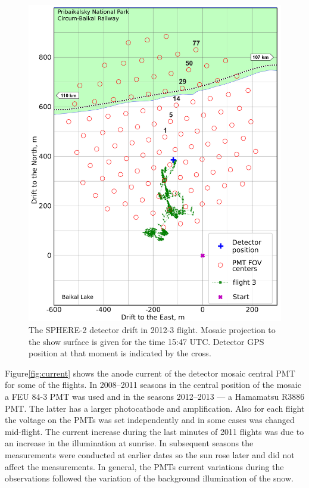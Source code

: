 \documentclass[universe,article,submit,moreauthors,pdftex]{Definitions/mdpi}
\begin{document}
\begin{paracol}{2}
\begin{figure}[tb]
\begin{minipage}[t]{0.48\textwidth}
        \includegraphics[width=\textwidth]{2012_drift-mod.pdf}
        \caption{The SPHERE-2 detector drift in 2012-3 flight. Mosaic projection to the show surface is given for the time 15:47 UTC. Detector GPS position at that moment is indicated by the cross.}
        \label{fig:2012-drift}
    \end{minipage}
\end{figure}

 Figure\ref{fig:current} shows the anode current of the detector mosaic central PMT for some of the flights. In 2008--2011 seasons in the central position of the mosaic a FEU 84-3 PMT was used and in the seasons 2012--2013 --- a Hamamatsu R3886 PMT. The latter has a larger photocathode and amplification. Also for each flight the voltage on the PMTs was set independently and in some cases was changed mid-flight. The current increase during the last minutes of 2011 flights was due to an increase in the illumination at sunrise. In subsequent seasons the measurements were conducted at earlier dates so the sun rose later and did not affect the measurements. In general, the PMTs current variations during the observations followed the variation of the background illumination of the snow.



\end{paracol}
\end{document}
